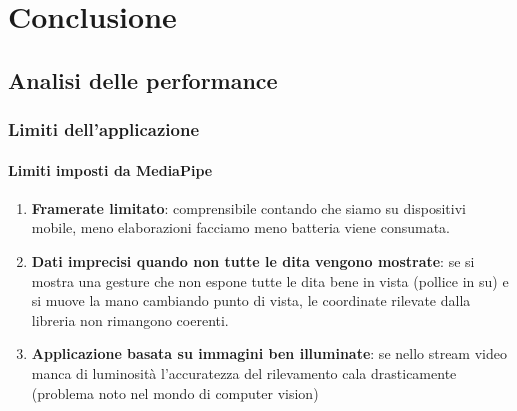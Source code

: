\chapter{Conclusione}

\section{Analisi delle performance}

\subsection{Limiti dell'applicazione}

\subsubsection{Limiti imposti da MediaPipe}
\begin{enumerate}
    \item \textbf{Framerate limitato}: comprensibile contando che siamo su dispositivi mobile, meno elaborazioni facciamo meno batteria viene consumata.
    \item \textbf{Dati imprecisi quando non tutte le dita vengono mostrate}: se si mostra una gesture che non espone tutte le dita bene in vista (pollice in su) e si muove la mano cambiando punto di vista, le coordinate rilevate dalla libreria non rimangono coerenti.
    \item \textbf{Applicazione basata su immagini ben illuminate}: se nello stream video manca di luminosità l'accuratezza del rilevamento cala drasticamente (problema noto nel mondo di computer vision)
\end{enumerate}

